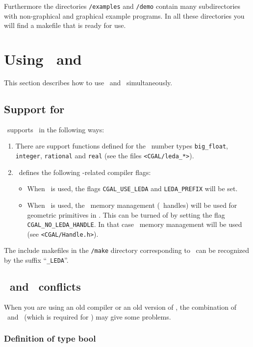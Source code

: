 Furthermore the directories \texttt{\cgaldir/examples} and \texttt{\cgaldir/demo}
contain many subdirectories with non-graphical and graphical example programs.
In all these directories you will find a makefile that is ready for use.

\section{Using \cgal\ and \leda \label{sec:leda}}
This section describes how to use \cgal\ and \leda\ simultaneously.

\subsection{Support for \leda}
\cgal\ supports \leda\ in the following ways:

\begin{enumerate}
\item
There are support functions defined for the \leda\ number types
\texttt{big\_float}, \texttt{integer}, \texttt{rational} and \texttt{real}
(see the files \texttt{<CGAL/leda\_*>}).

\item
\cgal\ defines the following \leda-related compiler flags:
\begin{itemize}
\item When \leda\ is used, the flags \texttt{CGAL\_USE\_LEDA} and
\texttt{LEDA\_PREFIX} will be set.
\item When \leda\ is used, the \leda\ memory management (\leda\ handles) will be
used for geometric primitives in \cgal. This can be turned of by setting the flag
\texttt{CGAL\_NO\_LEDA\_HANDLE}. In that case \cgal\ memory management will
be used (see \texttt{<CGAL/Handle.h>}).
\end{itemize}
\end{enumerate}

The include makefiles in the \texttt{\cgaldir/make} directory
corresponding to \leda\ can be recognized by the suffix
``\texttt{\_LEDA}''.

\subsection{\leda\ and \stl\ conflicts}

When you are using an old compiler or an old version of \stl, the combination of
\leda\ and \stl\ (which is required for \cgal) may give some problems.

\subsubsection{Definition of type bool}

